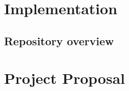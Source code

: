 \documentclass[12pt,twoside,notitlepage]{report}
\begin{document}


\chapter{Implementation}

    \section{Repository overview}


\printbibliography

\appendix
\chapter{Project Proposal}


\end{document}
